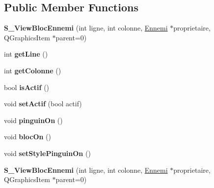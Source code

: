 \subsection*{Public Member Functions}
\begin{DoxyCompactItemize}
\item 
\hypertarget{class_s___view_bloc_ennemi_a61ac9969081699f9cc22f89dcfdba2e6}{}{\bfseries S\+\_\+\+View\+Bloc\+Ennemi} (int ligne, int colonne, \hyperlink{class_ennemi}{Ennemi} $\ast$proprietaire, Q\+Graphics\+Item $\ast$parent=0)\label{class_s___view_bloc_ennemi_a61ac9969081699f9cc22f89dcfdba2e6}

\item 
\hypertarget{class_s___view_bloc_ennemi_af570c3ab5ad404591829ef8bbed13b08}{}int {\bfseries get\+Line} ()\label{class_s___view_bloc_ennemi_af570c3ab5ad404591829ef8bbed13b08}

\item 
\hypertarget{class_s___view_bloc_ennemi_ae843182fc545b9c84c22322873e499cd}{}int {\bfseries get\+Colonne} ()\label{class_s___view_bloc_ennemi_ae843182fc545b9c84c22322873e499cd}

\item 
\hypertarget{class_s___view_bloc_ennemi_a5aef2bd784ad1c7c180de4f5608a9624}{}bool {\bfseries is\+Actif} ()\label{class_s___view_bloc_ennemi_a5aef2bd784ad1c7c180de4f5608a9624}

\item 
\hypertarget{class_s___view_bloc_ennemi_a976bc517403eeef48f2e7d8bb67dfa99}{}void {\bfseries set\+Actif} (bool actif)\label{class_s___view_bloc_ennemi_a976bc517403eeef48f2e7d8bb67dfa99}

\item 
\hypertarget{class_s___view_bloc_ennemi_a3c6bb606eaf348d513caf0bfd73fd0aa}{}void {\bfseries pinguin\+On} ()\label{class_s___view_bloc_ennemi_a3c6bb606eaf348d513caf0bfd73fd0aa}

\item 
\hypertarget{class_s___view_bloc_ennemi_a930acab8e21620c59f18144230a9a33d}{}void {\bfseries bloc\+On} ()\label{class_s___view_bloc_ennemi_a930acab8e21620c59f18144230a9a33d}

\item 
\hypertarget{class_s___view_bloc_ennemi_a215944e297397346d3d5c0a08ae3d1fb}{}void {\bfseries set\+Style\+Pinguin\+On} ()\label{class_s___view_bloc_ennemi_a215944e297397346d3d5c0a08ae3d1fb}

\item 
\hypertarget{class_s___view_bloc_ennemi_a61ac9969081699f9cc22f89dcfdba2e6}{}{\bfseries S\+\_\+\+View\+Bloc\+Ennemi} (int ligne, int colonne, \hyperlink{class_ennemi}{Ennemi} $\ast$proprietaire, Q\+Graphics\+Item $\ast$parent=0)\label{class_s___view_bloc_ennemi_a61ac9969081699f9cc22f89dcfdba2e6}


\end{DoxyCompactItemize}
